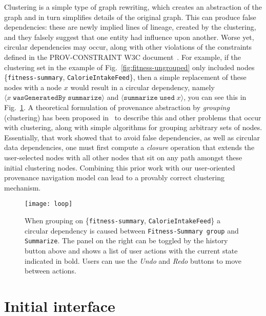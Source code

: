 Clustering is a simple type of graph rewriting, which creates an abstraction of the graph and in turn simplifies details of the original graph. This can produce false dependencies: these are newly implied lines of lineage, created by the clustering, and they falsely suggest that one entity had influence upon another. 
Worse yet, circular dependencies may occur, along with other violations of the constraints defined in the PROV-CONSTRAINT W3C document~\cite{w3c-prov-constraints}. For example, if the clustering set in the example of Fig.~\ref{fig:fitness-ungrouped} only included nodes \{\texttt{fitness-summary}, \texttt{CalorieIntakeFeed}\},  then a simple replacement of these nodes with a node $x$ would result in a circular dependency, namely $\langle x \; \mathtt{wasGeneratedBy} \; \mathtt{summarize}\rangle$ and $\langle \texttt{summarize} \; \texttt{used} \; x \rangle$, you can see this in Fig.~\ref{fig:loop}.
A theoretical formulation of provenance abstraction by \textit{grouping} (clustering) has been proposed in~\cite{Missier2014} to describe this and other problems that occur with clustering, along with simple algorithms for grouping arbitrary sets of nodes. 
Essentially, that work showed that to avoid false dependencies, as well as circular data dependencies, one must first compute a \textit{closure} operation that extends the user-selected nodes with all other nodes that sit on any path amongst these initial clustering nodes.
Combining this prior work with our user-oriented provenance navigation model can lead to a provably correct clustering mechanism. 

\begin{figure}[h]
	\centering
	\texttt{[image: loop]}
	\caption{When grouping on \{\texttt{fitness-summary}, \texttt{CalorieIntakeFeed}\} a circular dependency is caused between \texttt{Fitness-Summary group} and \texttt{Summarize}. The panel on the right can be toggled by the history button above and shows a list of user actions with the current state indicated in bold. Users can use the \textit{Undo} and \textit{Redo} buttons to move between actions.}
	\label{fig:loop}
\end{figure}


\chapter{Initial interface}


